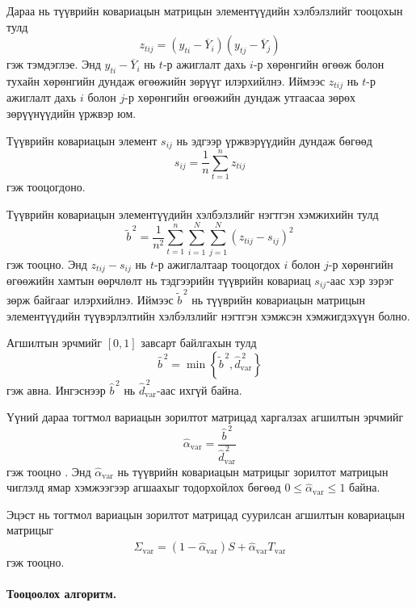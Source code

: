 Дараа нь түүврийн ковариацын матрицын элементүүдийн хэлбэлзлийг тооцохын тулд 
\[
z_{tij}
=
(y_{ti}-\overline{Y}_i)
(y_{tj}-\overline{Y}_j)
\]
гэж тэмдэглэе. Энд $y_{ti}-\overline{Y}_i$ нь $t$-р ажиглалт дахь $i$-р хөрөнгийн өгөөж болон тухайн хөрөнгийн дундаж өгөөжийн зөрүүг илэрхийлнэ. Иймээс $z_{tij}$ нь $t$-р ажиглалт дахь $i$ болон $j$-р хөрөнгийн өгөөжийн дундаж утгаасаа зөрөх зөрүүнүүдийн үржвэр юм.

Түүврийн ковариацын элемент $s_{ij}$ нь эдгээр үржвэрүүдийн дундаж бөгөөд
\[
s_{ij}
=
\frac{1}{n}
\sum_{t=1}^{n}z_{tij}
\]
гэж тооцогдоно.

Түүврийн ковариацын элементүүдийн хэлбэлзлийг нэгтгэн хэмжихийн тулд
\[
\widetilde{b}^{\,2}
=
\frac{1}{n^2}
\sum_{t=1}^{n}
\sum_{i=1}^{N}
\sum_{j=1}^{N}
(z_{tij}-s_{ij})^2
\]
гэж тооцно. Энд $z_{tij}-s_{ij}$ нь $t$-р ажиглалтаар тооцогдох $i$ болон $j$-р хөрөнгийн өгөөжийн хамтын өөрчлөлт нь тэдгээрийн түүврийн ковариац $s_{ij}$-аас хэр зэрэг зөрж байгааг илэрхийлнэ. Иймээс $\widetilde{b}^{\,2}$ нь түүврийн ковариацын матрицын элементүүдийн түүвэрлэлтийн хэлбэлзлийг нэгтгэн хэмжсэн хэмжигдэхүүн болно.

Агшилтын эрчмийг $[0,1]$ завсарт байлгахын тулд
\[
\widehat{b}^{\,2}
=
\min
\left\{
\widetilde{b}^{\,2},
\widehat{d}_{\mathrm{var}}^{\,2}
\right\}
\]
гэж авна. Ингэснээр $\widehat{b}^{\,2}$ нь $\widehat{d}_{\mathrm{var}}^{\,2}$-аас ихгүй байна.

Үүний дараа тогтмол вариацын зорилтот матрицад харгалзах агшилтын эрчмийг
\[
\widehat{\alpha}_{\mathrm{var}}
=
\frac{\widehat{b}^{\,2}}
{\widehat{d}_{\mathrm{var}}^{\,2}}
\]
гэж тооцно \citep{ledoitwolf2004a}. Энд $\widehat{\alpha}_{\mathrm{var}}$ нь түүврийн ковариацын матрицыг зорилтот матрицын чиглэлд ямар хэмжээгээр агшаахыг тодорхойлох бөгөөд $0\leq\widehat{\alpha}_{\mathrm{var}}\leq1$ байна.

Эцэст нь тогтмол вариацын зорилтот матрицад суурилсан агшилтын ковариацын матрицыг 
\[
\widehat{\Sigma}_{\mathrm{var}}
=
(1-\widehat{\alpha}_{\mathrm{var}})S
+
\widehat{\alpha}_{\mathrm{var}}T_{\mathrm{var}}
\]
гэж тооцно.

\paragraph{Тооцоолох алгоритм.}

